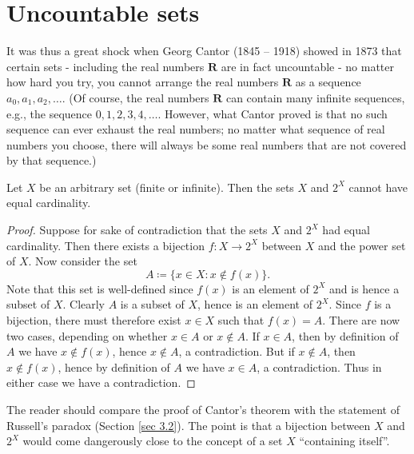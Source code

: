 \section{Uncountable sets}\label{sec 8.3}

\begin{note}
    It was thus a great shock when Georg Cantor (1845 -- 1918) showed in 1873 that certain sets
    - including the real numbers \(\mathbf{R}\) are in fact uncountable -
    no matter how hard you try, you cannot arrange the real numbers \(\mathbf{R}\) as a sequence \(a_0, a_1, a_2, \dots\).
    (Of course, the real numbers \(\mathbf{R}\) can contain many infinite sequences, e.g., the sequence \(0, 1, 2, 3, 4, \dots\).
    However, what Cantor proved is that no such sequence can ever exhaust the real numbers;
    no matter what sequence of real numbers you choose, there will always be some real numbers that are not covered by that sequence.)
\end{note}

\begin{theorem}\label{8.3.1}
    Let \(X\) be an arbitrary set (finite or infinite).
    Then the sets \(X\) and \(2^X\) cannot have equal cardinality.
\end{theorem}

\begin{proof}
    Suppose for sake of contradiction that the sets \(X\) and \(2^X\) had equal cardinality.
    Then there exists a bijection \(f : X \to 2^X\) between \(X\) and the power set of \(X\).
    Now consider the set
    \[
        A \coloneqq \{x \in X : x \notin f(x)\}.
    \]
    Note that this set is well-defined since \(f(x)\) is an element of \(2^X\) and is hence a subset of \(X\).
    Clearly \(A\) is a subset of \(X\), hence is an element of \(2^X\).
    Since \(f\) is a bijection, there must therefore exist \(x \in X\) such that \(f(x) = A\).
    There are now two cases, depending on whether \(x \in A\) or \(x \notin A\).
    If \(x \in A\), then by definition of \(A\) we have \(x \notin f(x)\), hence \(x \notin A\), a contradiction.
    But if \(x \notin A\), then \(x \notin f(x)\), hence by definition of \(A\) we have \(x \in A\), a contradiction.
    Thus in either case we have a contradiction.
\end{proof}

\begin{remark}\label{8.3.2}
    The reader should compare the proof of Cantor's theorem with the statement of Russell's paradox (Section \ref{sec 3.2}).
    The point is that a bijection between \(X\) and \(2^X\) would come dangerously close to the concept of a set \(X\) ``containing itself''.
\end{remark}

